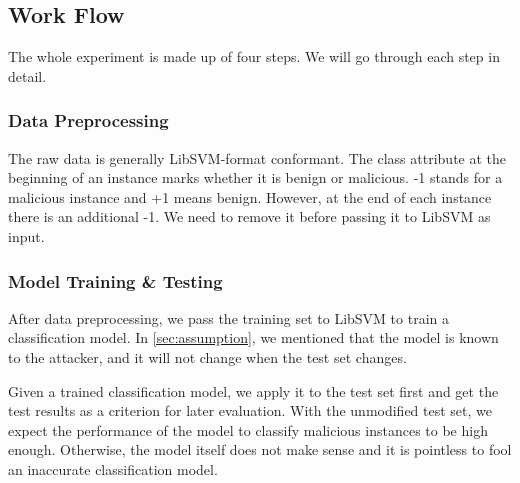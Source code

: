 \documentclass[11pt]{article}
\begin{document}


\subsection{Work Flow}
The whole experiment is made up of four steps. %
We will go through each step in detail.

\subsubsection{Data Preprocessing}
The raw data is generally LibSVM-format conformant. The class attribute at the beginning of an instance marks whether it is benign or malicious. -1 stands for a malicious instance and +1 means benign. However, at the end of each instance there is an additional -1. We need to remove it before passing it to LibSVM as input.

\subsubsection{Model Training \& Testing}
After data preprocessing, we pass the training set to LibSVM to train a classification model. In \ref{sec:assumption}, we mentioned that the model is known to the attacker, and it will not change when the test set changes. %

Given a trained classification model, we apply it to the test set first and get the test results as a criterion for later evaluation. With the unmodified test set, we expect the performance of the model to classify malicious instances to be high enough. Otherwise, the model itself does not make sense and it is pointless to fool an inaccurate classification model.
\end{document}
